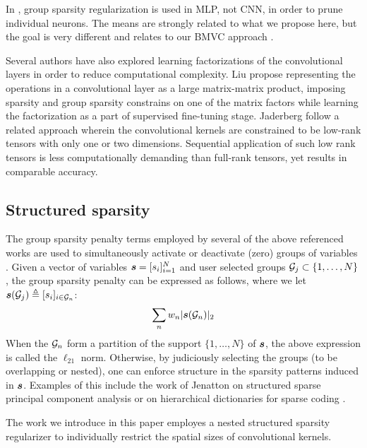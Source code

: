 In \cite{scardapane2016group}, group sparsity regularization is used in MLP, not CNN, in order to prune individual neurons. The means are strongly related to what we propose here, but the goal is very different and relates to our BMVC approach\cite{Kulkarnia} .

Several authors have also explored learning factorizations of the convolutional layers in order to reduce computational complexity. Liu \etal \cite{Liu2015} propose representing the operations in a convolutional layer as a large matrix-matrix product, imposing sparsity and group sparsity constrains on one of the matrix factors while learning the factorization as a part of supervised fine-tuning stage. Jaderberg \etal \cite{Jaderberg2014a} follow a related approach wherein the convolutional kernels are constrained to be low-rank tensors  with only one or two dimensions. Sequential application of such low rank tensors is less computationally demanding than full-rank tensors, yet results in comparable accuracy.

\subsection{Structured sparsity}
The group sparsity penalty terms employed by several of the above referenced works are used to simultaneously activate or deactivate (zero) groups of variables \cite{Bach}. Given a vector of variables $\bm{s} = [s_i]_{i=1}^N$ and user selected groups $\mathcal{G}_j \subset \{1,\ldots,N\}$, the group sparsity penalty can be expressed as follows, where we let $\bm{s}(\mathcal{G}_j) \triangleq [s_i]_{i \in \mathcal{G}_n}$:
\begin{equation}
  \sum_n w_n |\bm{s}(\mathcal{G}_n)|_2
\end{equation}
When the $\mathcal{G}_n$ form a partition of the support $\{1, \ldots, N\}$ of $\bm{s}$, the above expression is called the $\ell_{21}$ norm. Otherwise, by judiciously selecting the groups (\eg to be overlapping or nested), one can enforce structure in the sparsity patterns induced in $\bm{s}$. Examples of this include the work of Jenatton \etal on structured sparse principal component analysis \cite{Jenatton2010a} or on hierarchical dictionaries for sparse coding \cite{Jenatton2010}. 

The work we introduce in this paper employes a nested structured sparsity regularizer to individually restrict the spatial sizes of convolutional kernels.

